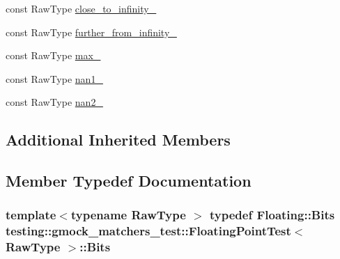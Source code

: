 \begin{DoxyCompactItemize}
const Raw\+Type \hyperlink{classtesting_1_1gmock__matchers__test_1_1_floating_point_test_a6fc8ac2030f4883e1c84da3a21bbb7c3}{close\+\_\+to\+\_\+infinity\+\_\+}
\item 
const Raw\+Type \hyperlink{classtesting_1_1gmock__matchers__test_1_1_floating_point_test_a603ab51280ecb1c4147c2660a7a90728}{further\+\_\+from\+\_\+infinity\+\_\+}
\item 
const Raw\+Type \hyperlink{classtesting_1_1gmock__matchers__test_1_1_floating_point_test_a17b9dd56136b64fa7210bfe024d88c30}{max\+\_\+}
\item 
const Raw\+Type \hyperlink{classtesting_1_1gmock__matchers__test_1_1_floating_point_test_a0d2544956414eac21d4519fe600e4603}{nan1\+\_\+}
\item 
const Raw\+Type \hyperlink{classtesting_1_1gmock__matchers__test_1_1_floating_point_test_a4af3b3e53a06d271479ff30f5d5ee155}{nan2\+\_\+}
\end{DoxyCompactItemize}
\subsection*{Additional Inherited Members}


\subsection{Member Typedef Documentation}
\subsubsection[{\texorpdfstring{Bits}{Bits}}]{\setlength{\rightskip}{0pt plus 5cm}template$<$typename Raw\+Type $>$ typedef {\bf Floating\+::\+Bits} {\bf testing\+::gmock\+\_\+matchers\+\_\+test\+::\+Floating\+Point\+Test}$<$ Raw\+Type $>$\+::{\bf Bits}\hspace{0.3cm}{\ttfamily [protected]}}\hypertarget{classtesting_1_1gmock__matchers__test_1_1_floating_point_test_addf899bd832ae51103198d201d2f2ea2}{}\label{classtesting_1_1gmock__matchers__test_1_1_floating_point_test_addf899bd832ae51103198d201d2f2ea2}

